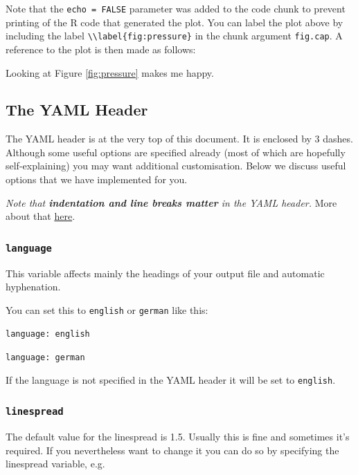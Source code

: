 \documentclass[11pt,a4paper]{article}
\begin{document}
Note that the \texttt{echo\ =\ FALSE} parameter was added to the code
chunk to prevent printing of the R code that generated the plot. You can
label the plot above by including the label
\texttt{\textbackslash{}\textbackslash{}label\{fig:pressure\}} in the
chunk argument \texttt{fig.cap}. A reference to the plot is then made as
follows:

Looking at Figure \ref{fig:pressure} makes me happy.

\hypertarget{the-yaml-header}{%
\subsection{The YAML Header}\label{the-yaml-header}}

The YAML header is at the very top of this document. It is enclosed by 3
dashes. Although some useful options are specified already (most of
which are hopefully self-explaining) you may want additional
customisation. Below we discuss useful options that we have implemented
for you.

\emph{Note that \textbf{indentation and line breaks matter} in the YAML
header.} More about that
\href{https://learn-the-web.algonquindesign.ca/topics/markdown-yaml-cheat-sheet/\#yaml}{here}.

\hypertarget{language}{%
\subsubsection{\texorpdfstring{\texttt{language}}{language}}\label{language}}

This variable affects mainly the headings of your output file and
automatic hyphenation.

You can set this to \texttt{english} or \texttt{german} like this:

\texttt{language:\ english}

\texttt{language:\ german}

If the language is not specified in the YAML header it will be set to
\texttt{english}.

\hypertarget{linespread}{%
\subsubsection{\texorpdfstring{\texttt{linespread}}{linespread}}\label{linespread}}

The default value for the linespread is 1.5. Usually this is fine and
sometimes it's required. If you nevertheless want to change it you can
do so by specifying the linespread variable, e.g.
\end{document}
